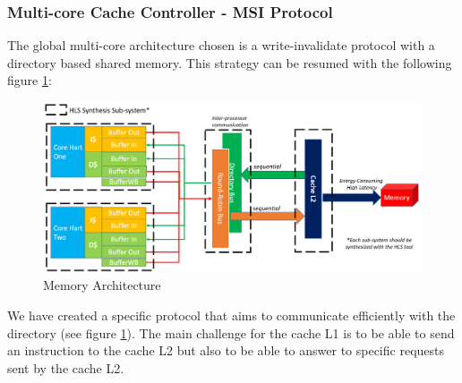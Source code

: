 \documentclass[10pt,letterpaper]{article}
\begin{document}
\subsubsection{Multi-core Cache Controller - MSI Protocol}

The global multi-core architecture chosen is a write-invalidate protocol with a directory based shared memory. This strategy can be resumed with the following figure \ref{fig:mem_dir}:\\

\begin{figure}[H]
\centering
\includegraphics[width=12cm]{img/multi_proc/multi_core_mem.PNG}
\caption{Memory Architecture}
\label{fig:mem_dir}
\end{figure}

\newpage

\noindent We have created a specific protocol that aims to communicate efficiently with the directory (see figure \ref{fig:mem_dir}). The main challenge for the cache L1 is to be able to send an instruction to the cache L2 but also to be able to answer to specific requests sent by the cache L2.
\end{document}
